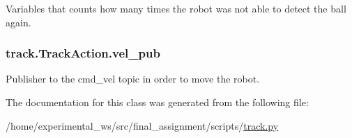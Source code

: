 Variables that counts how many times the robot was not able to detect the ball again. 

\subsubsection[{\texorpdfstring{vel\+\_\+pub}{vel_pub}}]{\setlength{\rightskip}{0pt plus 5cm}track.\+Track\+Action.\+vel\+\_\+pub\hspace{0.3cm}{\ttfamily [static]}}\hypertarget{classtrack_1_1TrackAction_af6105c2cad0d325296213d7c03c4fb6e}{}\label{classtrack_1_1TrackAction_af6105c2cad0d325296213d7c03c4fb6e}


Publisher to the cmd\+\_\+vel topic in order to move the robot. 



The documentation for this class was generated from the following file\+:\begin{DoxyCompactItemize}
\item 
/home/experimental\+\_\+ws/src/final\+\_\+assignment/scripts/\hyperlink{track_8py}{track.\+py}\end{DoxyCompactItemize}
